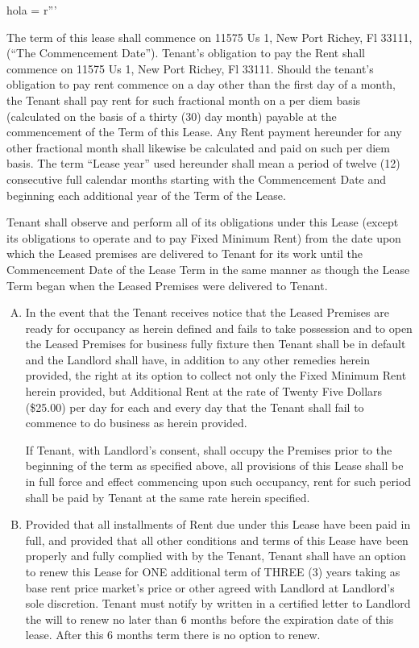 hola = r'''\documentclass{article}
\newcommand{\commencementdate}{11575 Us 1, New Port Richey, Fl 33111}
\newcommand{\rentcommencementdate}{11575 Us 1, New Port Richey, Fl 33111}
\begin{document}
    The term of this lease shall commence on \commencementdate,{} (``The Commencement Date'').  Tenant’s obligation to pay the Rent shall commence on \rentcommencementdate {}.  Should the tenant’s obligation to pay rent commence on a day other than the first day of a month, the Tenant shall pay rent for such fractional month on a per diem basis (calculated on the basis of a thirty (30) day month) payable at the commencement of the Term of this Lease.  Any Rent payment hereunder for any other fractional month shall likewise be calculated and paid on such per diem basis.  The term ``Lease year'' used hereunder shall mean a period of twelve (12) consecutive full calendar months starting with the Commencement Date and beginning each additional year of the Term of the Lease.

	Tenant shall observe and perform all of its obligations under this Lease (except its obligations to operate and to pay Fixed Minimum Rent) from the date upon which the Leased premises are delivered to Tenant for its work until the Commencement Date of the Lease Term in the same manner as though the Lease Term began when the Leased Premises were delivered to Tenant.

    \begin{enumerate}[(A)]
    \item In the event that the Tenant receives notice that the Leased Premises are ready for occupancy as herein defined and fails to take possession and to open the Leased Premises for business fully fixture then Tenant shall be in default and the Landlord shall have, in addition to any other remedies herein provided, the right at its option to collect not only the Fixed Minimum Rent herein provided, but Additional Rent at the rate of Twenty Five Dollars (\$25.00) per day for each and every day that the Tenant shall fail to commence to do business as herein provided. 

    If Tenant, with Landlord's consent, shall occupy the Premises prior to the beginning of the term as specified above, all provisions of this Lease shall be in full force and effect commencing upon such occupancy, rent for such period shall be paid by Tenant at the same rate herein specified. 

    
    \item Provided that all installments of Rent due under this Lease have been paid in full, and provided that all other conditions and terms of this Lease have been properly and fully complied with by the Tenant, Tenant shall have an option to renew this Lease for ONE additional term of THREE (3) years taking as base rent price market’s price or other agreed with Landlord at Landlord’s sole discretion.  Tenant must notify by written in a certified letter to Landlord the will to renew no later than 6 months before the expiration date of this lease.  After this 6 months term there is no option to renew.
    
    \end{enumerate}
    
\end{document}
